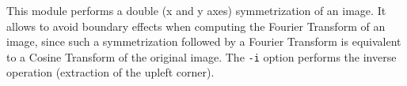 This module performs a double (x and y axes) symmetrization of an image.
It allows to avoid boundary effects 
when computing the Fourier Transform
of an image, since such
a symmetrization followed by a Fourier Transform is equivalent to 
a Cosine Transform of the original image.
The \verb+-i+ option performs the inverse operation (extraction of
the upleft corner). 

